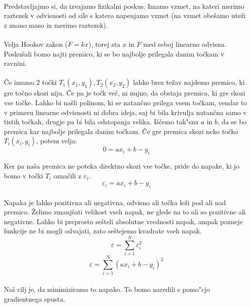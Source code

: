 \paragraph{}
Predstavljajmo si, da izvajamo fizikalni poskus. Imamo vzmet, na kateri merimo raztezek v odvisnosti od sile s katero napenjamo vzmet (na vzmet obešamo uteži z znano maso in merimo raztezek).

\paragraph{}
Velja Hookov zakon ($F = k x$), torej sta $x$ in $F$ med seboj linearno odvisna. Poskušali bomo najti premico, ki se bo najbolje prilegala danim točkam v ravnini.

\paragraph{}
Če imamo 2 točki $T_1(x_1, y_1), T_2(x_2, y_2)$ lahko brez težav najdemo premico, ki gre točno skozi niju. Če pa je točk več, ni nujno, da obstaja premica, ki gre skozi vse točke. Lahko bi našli polinom, ki se natančno prilega vsem točkam, vendar to v primeru linearne odvisnosti ni dobra ideja, saj bi bila krivulja natančna samo v tistih točkah, drugje pa bi bila odstopanja velika. Iščemo tak"sna $a$ in $b$, da se bo premica kar najbolje prilegala danim točkam. Če gre premica skozi neko točko $T_i(x_i, y_i)$, potem velja:
$$0 = a x_i + b - y_i$$

Ker pa naša premica ne poteka direktno skozi vse točke, pride do napake, ki jo bomo v točki $T_i$ označili z $\varepsilon_i$.
$$\varepsilon_i = a x_i + b - y_i$$

\paragraph{}
Napaka je lahko pozitivna ali negativna, odvisno ali točka leži pod ali nad premico. Želimo zmanjšati velikost vseh napak, ne glede na to ali so pozitivne ali negativne. Lahko bi preprosto sešteli absolutne vrednosti napak, ampak pozneje funkcije ne bi mogli odvajati, zato seštejemo kvadrate vseh napak.
$$\varepsilon = \sum_{i=1}^{N} \varepsilon_i^2$$
$$\varepsilon = \sum_{i=1}^{N} (a x_i + b - y_i)^2$$

\paragraph{}
Naš cilj je, da minimiziramo to napako. To bomo naredili s pomo"cjo gradientnega spusta.
